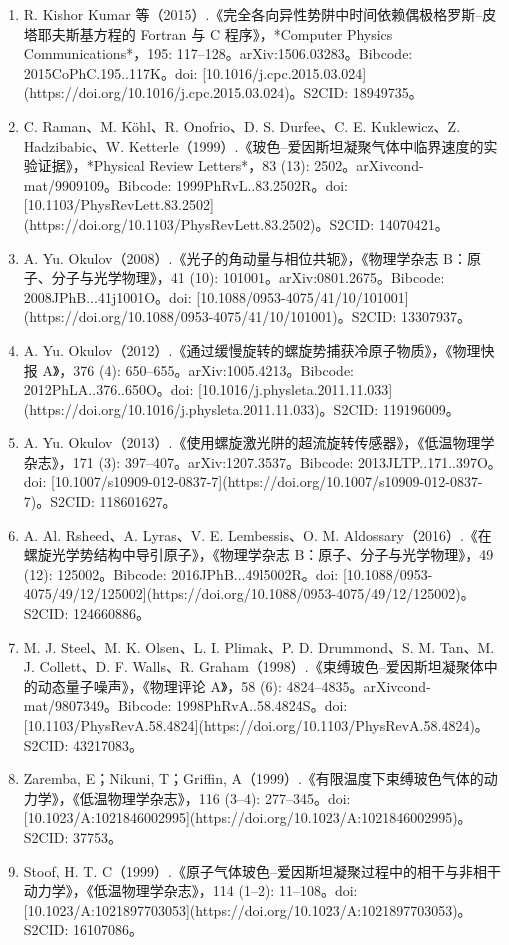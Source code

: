 \begin{enumerate}
\item R. Kishor Kumar 等（2015）.《完全各向异性势阱中时间依赖偶极格罗斯–皮塔耶夫斯基方程的 Fortran 与 C 程序》，*Computer Physics Communications*，195: 117–128。arXiv:1506.03283。Bibcode: 2015CoPhC.195..117K。doi: [10.1016/j.cpc.2015.03.024](https://doi.org/10.1016/j.cpc.2015.03.024)。S2CID: 18949735。
\item C. Raman、M. Köhl、R. Onofrio、D. S. Durfee、C. E. Kuklewicz、Z. Hadzibabic、W. Ketterle（1999）.《玻色–爱因斯坦凝聚气体中临界速度的实验证据》，*Physical Review Letters*，83 (13): 2502。arXiv\:cond-mat/9909109。Bibcode: 1999PhRvL..83.2502R。doi: [10.1103/PhysRevLett.83.2502](https://doi.org/10.1103/PhysRevLett.83.2502)。S2CID: 14070421。
\item A. Yu. Okulov（2008）.《光子的角动量与相位共轭》，《物理学杂志 B：原子、分子与光学物理》，41 (10): 101001。arXiv:0801.2675。Bibcode: 2008JPhB...41j1001O。doi: [10.1088/0953-4075/41/10/101001](https://doi.org/10.1088/0953-4075/41/10/101001)。S2CID: 13307937。
\item A. Yu. Okulov（2012）.《通过缓慢旋转的螺旋势捕获冷原子物质》，《物理快报 A》，376 (4): 650–655。arXiv:1005.4213。Bibcode: 2012PhLA..376..650O。doi: [10.1016/j.physleta.2011.11.033](https://doi.org/10.1016/j.physleta.2011.11.033)。S2CID: 119196009。
\item A. Yu. Okulov（2013）.《使用螺旋激光阱的超流旋转传感器》，《低温物理学杂志》，171 (3): 397–407。arXiv:1207.3537。Bibcode: 2013JLTP..171..397O。doi: [10.1007/s10909-012-0837-7](https://doi.org/10.1007/s10909-012-0837-7)。S2CID: 118601627。
\item A. Al. Rsheed、A. Lyras、V. E. Lembessis、O. M. Aldossary（2016）.《在螺旋光学势结构中导引原子》，《物理学杂志 B：原子、分子与光学物理》，49 (12): 125002。Bibcode: 2016JPhB...49l5002R。doi: [10.1088/0953-4075/49/12/125002](https://doi.org/10.1088/0953-4075/49/12/125002)。S2CID: 124660886。
\item M. J. Steel、M. K. Olsen、L. I. Plimak、P. D. Drummond、S. M. Tan、M. J. Collett、D. F. Walls、R. Graham（1998）.《束缚玻色–爱因斯坦凝聚体中的动态量子噪声》，《物理评论 A》，58 (6): 4824–4835。arXiv\:cond-mat/9807349。Bibcode: 1998PhRvA..58.4824S。doi: [10.1103/PhysRevA.58.4824](https://doi.org/10.1103/PhysRevA.58.4824)。S2CID: 43217083。
\item Zaremba, E；Nikuni, T；Griffin, A（1999）.《有限温度下束缚玻色气体的动力学》，《低温物理学杂志》，116 (3–4): 277–345。doi: [10.1023/A:1021846002995](https://doi.org/10.1023/A:1021846002995)。S2CID: 37753。
\item  Stoof, H. T. C（1999）.《原子气体玻色–爱因斯坦凝聚过程中的相干与非相干动力学》，《低温物理学杂志》，114 (1–2): 11–108。doi: [10.1023/A:1021897703053](https://doi.org/10.1023/A:1021897703053)。S2CID: 16107086。

\end{enumerate}
